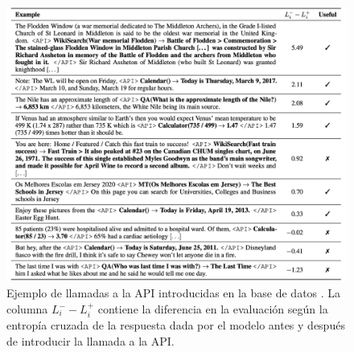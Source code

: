\begin{figure}[tb]
    \centering
    \includegraphics[width=\textwidth]{figures/chapter3/toolformer.png}
    \caption{Ejemplo de llamadas a la API introducidas en la base de datos \cite{schick2023toolformer}. La columna \(L_i^- - L_i^+ \) contiene la diferencia en la evaluación según la entropía cruzada de la respuesta dada por el modelo antes y después de introducir la llamada a la API. \cite{schick2023toolformer}}
    \label{fig:toolformer}
\end{figure}
